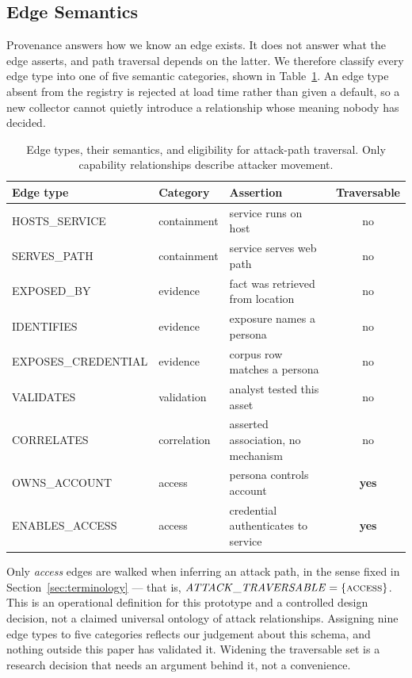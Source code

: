 \documentclass[11pt,a4paper]{article}
\newcommand{\bs}{\discretionary{}{}{}}
\begin{document}
\subsection{Edge Semantics}\label{sec:semantics}
Provenance answers how we know an edge exists. It does not answer what the edge asserts, and path traversal depends on the latter. We therefore classify every edge type into one of five semantic categories, shown in Table~\ref{tab:semantics}. An edge type absent from the registry is rejected at load time rather than given a default, so a new collector cannot quietly introduce a relationship whose meaning nobody has decided.

\begin{table}[H]
\centering
\caption{Edge types, their semantics, and eligibility for attack-path traversal.
Only capability relationships describe attacker movement.}
\label{tab:semantics}
\small
\begin{tabular}{p{}p{}p{}c}
\toprule
Edge type & Category & Assertion & Traversable \\
\midrule
HOSTS\_SERVICE & containment & service runs on host & no \\
SERVES\_PATH & containment & service serves web path & no \\
EXPOSED\_BY & evidence & fact was retrieved from location & no \\
IDENTIFIES & evidence & exposure names a persona & no \\
EXPOSES\_\bs CREDENTIAL & evidence & corpus row matches a persona & no \\
VALIDATES & validation & analyst tested this asset & no \\
CORRELATES & correlation & asserted association, no mechanism & no \\
OWNS\_ACCOUNT & access & persona controls account & \textbf{yes} \\
ENABLES\_ACCESS & access & credential authenticates to service & \textbf{yes} \\
\bottomrule
\end{tabular}
\end{table}

Only \emph{access} edges are walked when inferring an attack path, in the sense fixed in Section~\ref{sec:terminology} --- that is, $\mathit{ATTACK\_TRAVERSABLE} = \{\textsc{access}\}$. This is an operational definition for this prototype and a controlled design decision, not a claimed universal ontology of attack relationships. Assigning nine edge types to five categories reflects our judgement about this schema, and nothing outside this paper has validated it. Widening the traversable set is a research decision that needs an argument behind it, not a convenience.
\end{document}
